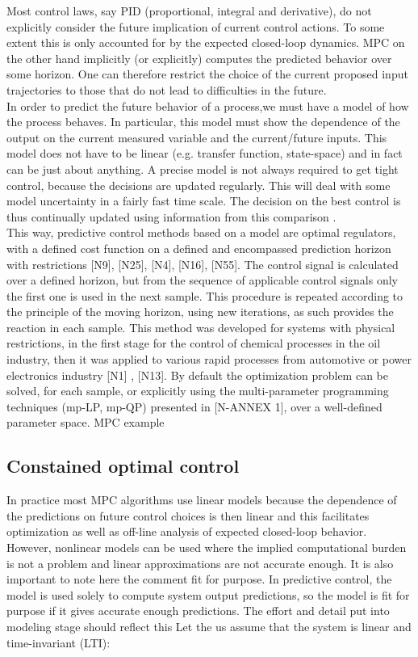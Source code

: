 Most control laws, say PID (proportional, integral and derivative), do not explicitly consider the future implication of current control actions. To some extent this is only accounted for by the expected closed-loop dynamics. MPC on the other hand
implicitly (or explicitly) computes the predicted behavior over some horizon. One can therefore restrict the choice of the current proposed input trajectories to those that do not lead to difficulties in the future.\\
In order to predict the future behavior of a process,we must have a model of how the process behaves. In particular, this model must show the dependence of the output on the current measured variable and the current/future inputs. This model does not
have to be linear (e.g. transfer function, state-space) and in fact can be just about anything. A precise model is not always required to get tight control, because the decisions are updated regularly. This will deal with some model uncertainty in a fairly
fast time scale. The decision on the best control is thus continually updated using information from this comparison \cite{rossiter2017model}.\\
This way, predictive control methods based on a model are optimal regulators, with a defined cost function on a defined and encompassed  	prediction horizon with restrictions [N9], [N25], [N4], [N16], [N55]. The control signal is calculated over a defined horizon, but from the sequence of applicable control signals only the first one is used in the next sample. This procedure is repeated according to the principle of the moving horizon, using new iterations, as such provides the reaction in each sample. This method was developed for systems with physical restrictions, in the first stage for the control of chemical processes in the oil industry, then it was applied to various rapid processes from automotive or power electronics industry [N1] , [N13]. By default the optimization problem can be solved, for each sample, or explicitly using the multi-parameter programming techniques (mp-LP, mp-QP) presented in [N-ANNEX 1], over a well-defined parameter space.
	MPC example
	
	\subsection{Constained optimal control}\label{BASICCSR:sec:OptimalControl}
	
	In practice most MPC algorithms use linear models because the dependence of the predictions on future control choices is then linear and this facilitates optimization as well as off-line analysis of expected closed-loop behavior. However, nonlinear
models can be used where the implied computational burden is not a problem and linear approximations are not accurate enough.
It is also important to note here the comment fit for purpose. In predictive control, the model is used solely to compute system output predictions, so the model is fit for purpose if it gives accurate enough predictions. The effort and detail put into
modeling stage should reflect this
	Let the us assume that the system is linear and time-invariant (LTI):
	
